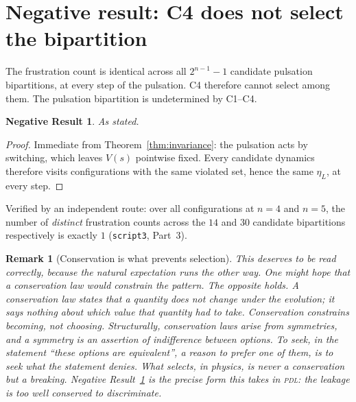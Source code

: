 \documentclass[11pt,a4paper]{article}
\def\mathcal#1{#1}%
\newtheorem{remark}[theorem]{Remark}
\newtheorem{negresult}[theorem]{Negative Result}
\newcommand{\PDL}{\textsc{pdl}}
\newcommand{\etaL}{\eta_L}
\begin{document}
\section{Negative result: C4 does not select the bipartition}
\label{sec:blind}

\begin{negbox}
The frustration count is identical across all $2^{n-1}-1$ candidate pulsation bipartitions, at every step of the pulsation. C4 therefore cannot select among them. The pulsation bipartition is undetermined by C1--C4.
\end{negbox}

\begin{negresult}
\label{neg:C4blind}
As stated.
\end{negresult}

\begin{proof}
Immediate from Theorem~\ref{thm:invariance}: the pulsation acts by switching, which leaves $\mathcal{V}(s)$ pointwise fixed. Every candidate dynamics therefore visits configurations with the same violated set, hence the same $\etaL$, at every step.
\end{proof}

Verified by an independent route: over all configurations at $n=4$ and $n=5$, the number of \emph{distinct} frustration counts across the $14$ and $30$ candidate bipartitions respectively is exactly $1$ (\texttt{script3}, Part~3).

\begin{remark}[Conservation is what prevents selection]
This deserves to be read correctly, because the natural expectation runs the other way. One might hope that a conservation law would constrain the pattern. The opposite holds. A conservation law states that a quantity does not change under the evolution; it says nothing about which value that quantity had to take. Conservation constrains becoming, not choosing. Structurally, conservation laws arise from symmetries, and a symmetry is an assertion of indifference between options. To seek, in the statement ``these options are equivalent'', a reason to prefer one of them, is to seek what the statement denies. What selects, in physics, is never a conservation but a breaking. Negative Result~\ref{neg:C4blind} is the precise form this takes in \PDL: the leakage is \emph{too} well conserved to discriminate.
\end{remark}
\end{document}
